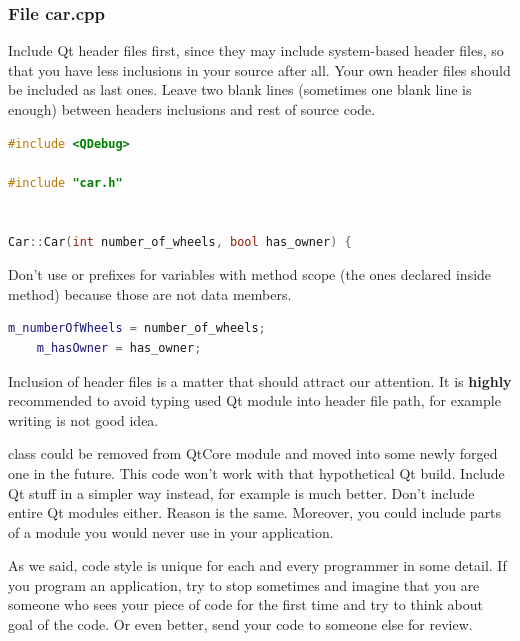 \subsubsection*{File car.cpp}
Include Qt header files first, since they may include system-based header files, so that you have less inclusions in your source after all. Your own header files should be included as last ones. Leave two blank lines (sometimes one blank line is enough) between headers inclusions and rest of source code.
\begin{lstlisting}[firstnumber=1,language=cpp]
#include <QDebug>

#include "car.h"


Car::Car(int number_of_wheels, bool has_owner) {
\end{lstlisting}
Don't use or prefixes for variables with method scope (the ones declared inside method) because those are not data members.
\begin{lstlisting}[firstnumber=6,language=cpp]
    m_numberOfWheels = number_of_wheels;
    m_hasOwner = has_owner;
\end{lstlisting}

\begin{fdocextra}
Inclusion of header files is a matter that should attract our attention. It is \textbf{highly} recommended to avoid typing used Qt module into header file path, for example writing is not good idea.

 class could be removed from QtCore module and moved into some newly forged one in the future.\footnotemark{} This code won't work with that hypothetical Qt build. Include Qt stuff in a simpler way instead, for example is much better. Don't include entire Qt modules either. Reason is the same. Moreover, you could include parts of a module you would never use in your application.
\end{fdocextra}

As we said, code style is unique for each and every programmer in some detail. If you program an application, try to stop sometimes and imagine that you are someone who sees your piece of code for the first time and try to think about goal of the code. Or even better, send your code to someone else for review.
